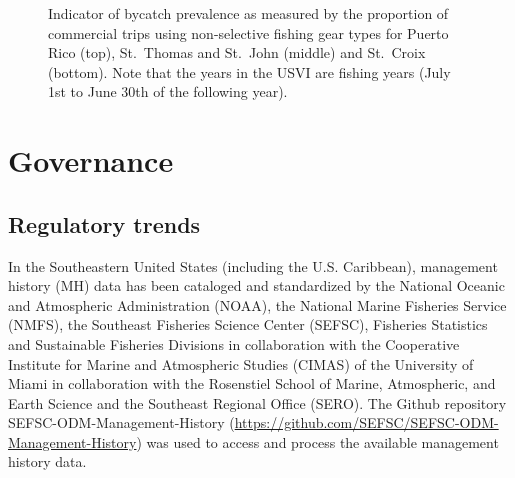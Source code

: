 \documentclass[
  letterpaper,
  oneside,
  open=any]{scrbook}
\begin{document}
\begin{figure}


\caption{\label{fig-bycatch}Indicator of bycatch prevalence as measured
by the proportion of commercial trips using non-selective fishing gear
types for Puerto Rico (top), St.~Thomas and St.~John (middle) and
St.~Croix (bottom). Note that the years in the USVI are fishing years
(July 1st to June 30th of the following year).}

\end{figure}%

\section{Governance}\label{governance}

\subsection{Regulatory trends}\label{regulatory-trends}

In the Southeastern United States (including the U.S. Caribbean),
management history (MH) data has been cataloged and standardized by the
National Oceanic and Atmospheric Administration (NOAA), the National
Marine Fisheries Service (NMFS), the Southeast Fisheries Science Center
(SEFSC), Fisheries Statistics and Sustainable Fisheries Divisions in
collaboration with the Cooperative Institute for Marine and Atmospheric
Studies (CIMAS) of the University of Miami in collaboration with the
Rosenstiel School of Marine, Atmospheric, and Earth Science and the
Southeast Regional Office (SERO). The Github repository
SEFSC-ODM-Management-History
(\url{https://github.com/SEFSC/SEFSC-ODM-Management-History}) was used
to access and process the available management history data.
\end{document}
